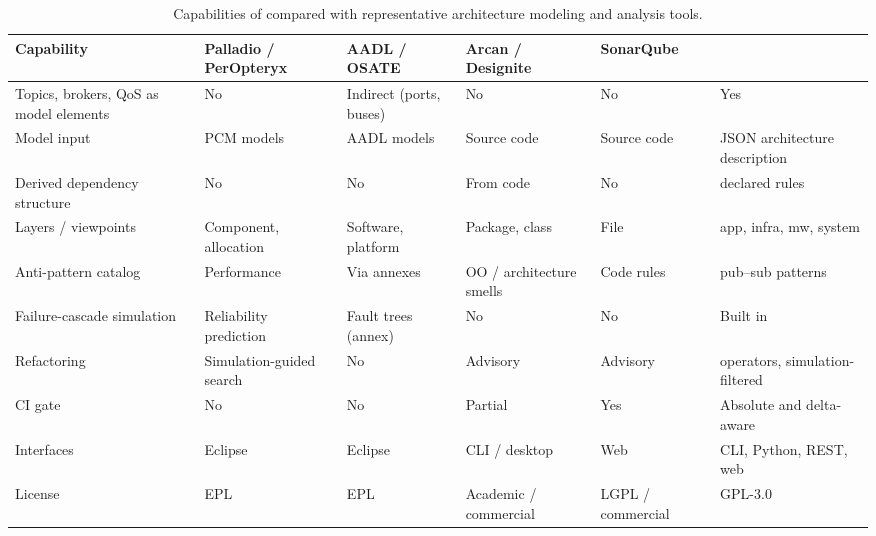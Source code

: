 \begin{table}[htbp]
\centering
\footnotesize
\setlength{\tabcolsep}{3pt}
\caption{Capabilities of \sag{} compared with representative architecture modeling and analysis tools.}
\label{tab:sota_comparison}
\begin{tabularx}{\textwidth}{>{\raggedright\arraybackslash}X>{\raggedright\arraybackslash}p{2.1cm}>{\raggedright\arraybackslash}p{1.9cm}>{\raggedright\arraybackslash}p{2.0cm}>{\raggedright\arraybackslash}p{1.8cm}>{\raggedright\arraybackslash}p{2.3cm}}
\toprule
\textbf{Capability} & \textbf{Palladio / PerOpteryx} & \textbf{AADL / OSATE} & \textbf{Arcan / Designite} & \textbf{SonarQube} & \textbf{\sag{}} \\
\midrule
Topics, brokers, QoS as model elements & No & Indirect (ports, buses) & No & No & Yes \\
Model input & PCM models & AADL models & Source code & Source code & JSON architecture description \\
Derived dependency structure & No & No & From code & No & 7 declared rules \\
Layers / viewpoints & Component, allocation & Software, platform & Package, class & File & app, infra, mw, system \\
Anti-pattern catalog & Performance & Via annexes & OO / architecture smells & Code rules & 19 pub--sub patterns \\
Failure-cascade simulation & Reliability prediction & Fault trees (annex) & No & No & Built in \\
Refactoring & Simulation-guided search & No & Advisory & Advisory & 3 operators, simulation-filtered \\
CI gate & No & No & Partial & Yes & Absolute and delta-aware \\
Interfaces & Eclipse & Eclipse & CLI / desktop & Web & CLI, Python, REST, web \\
License & EPL & EPL & Academic / commercial & LGPL / commercial & GPL-3.0 \\
\bottomrule
\end{tabularx}
\end{table}
